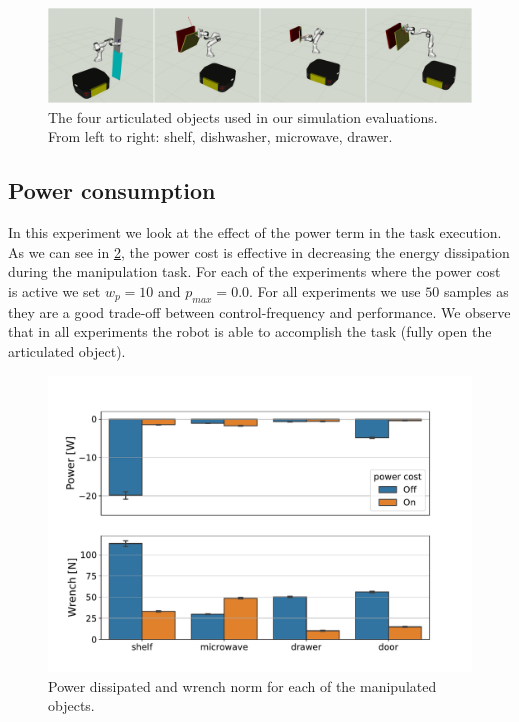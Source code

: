 \begin{figure}[t]
\centering
  \includegraphics[width=\columnwidth]{framework_manipulation/figures/mosaics/articulated_objects_sim.pdf}
  \caption{The four articulated objects used in our simulation evaluations. From left to right: shelf, dishwasher, microwave, drawer.} \label{fig:object_manipulation}
\end{figure}

\subsection{Power consumption}
In this experiment we look at the effect of the power term in the task execution. As we can see in \fig \ref{fig:power_cost_comparison}, the power cost is effective in decreasing the energy dissipation during the manipulation task. For each of the experiments where the power cost is active we set $w_p=10$ and $p_{max} = 0.0$. For all experiments we use $50$ samples as they are a good trade-off between control-frequency and performance. We observe that in all experiments the robot is able to accomplish the task (fully open the articulated object). 

\begin{figure}[t]
\centering
  \includegraphics[width=\columnwidth]{figures/methods_comparison/power_cost.pdf}
  \caption{Power dissipated and wrench norm for each of the manipulated objects.} \label{fig:power_cost_comparison}
\end{figure}


